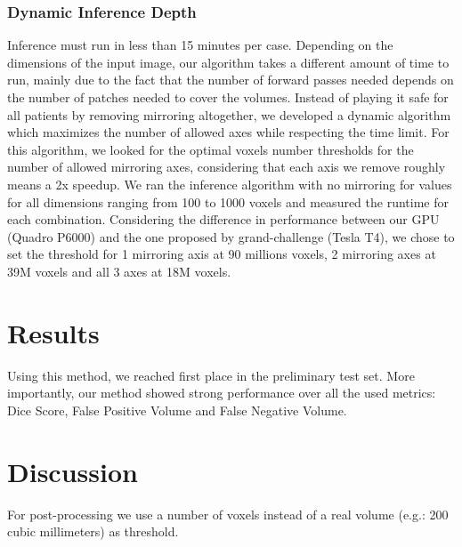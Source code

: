 \documentclass[runningheads]{llncs}
\begin{document}
\subsubsection{Dynamic Inference Depth}
Inference must run in less than 15 minutes per case.
Depending on the dimensions of the input image, our algorithm takes a different amount of time to run, mainly due to the fact that the number of forward passes needed depends on the number of patches needed to cover the volumes.
Instead of playing it safe for all patients by removing mirroring altogether, we developed a dynamic algorithm which maximizes the number of allowed axes while respecting the time limit.
For this algorithm, we looked for the optimal voxels number thresholds for the number of allowed mirroring axes, considering that each axis we remove roughly means a 2x speedup.
We ran the inference algorithm with no mirroring for values for all dimensions ranging from 100 to 1000 voxels and measured the runtime for each combination.
Considering the difference in performance between our GPU (Quadro P6000) and the one proposed by grand-challenge (Tesla T4), we chose to set the threshold for 1 mirroring axis at 90 millions voxels, 2 mirroring axes at 39M voxels and all 3 axes at 18M voxels.

\section{Results}
Using this method, we reached first place in the preliminary test set.
More importantly, our method showed strong performance over all the used metrics: Dice Score, False Positive Volume and False Negative Volume.

\section{Discussion}
For post-processing we use a number of voxels instead of a real volume (e.g.: 200 cubic millimeters) as threshold.

%
%
%


%
\end{document}
